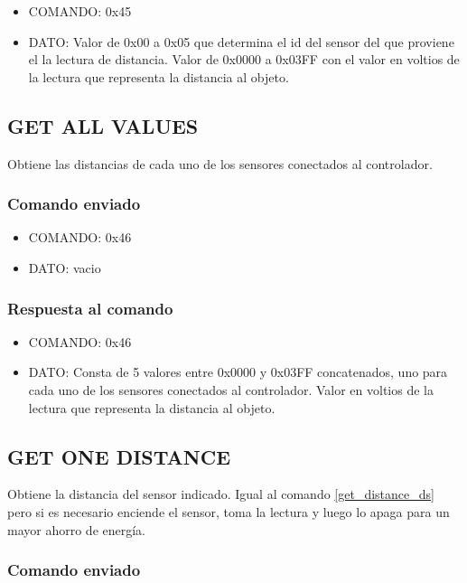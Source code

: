 \documentclass[a4paper,10pt]{article}
\begin{document}
\begin{itemize}
	\item{COMANDO:} 0x45
	\item{DATO:} Valor de 0x00 a 0x05 que determina el id del sensor del que proviene el la lectura de distancia.
	Valor de 0x0000 a 0x03FF con el valor en voltios de la lectura que representa la distancia al objeto.
\end{itemize}

\subsection{GET ALL VALUES}
\label{get_all_values_ds}

Obtiene las distancias de cada uno de los sensores conectados al controlador.

\subsubsection*{Comando enviado}

\begin{itemize}
	\item{COMANDO:} 0x46
	\item{DATO:} vacio
\end{itemize}

\subsubsection*{Respuesta al comando}

\begin{itemize}
	\item{COMANDO:} 0x46
	\item{DATO:} Consta de 5 valores entre 0x0000 y 0x03FF concatenados, uno para cada uno de los sensores conectados al controlador.
	Valor en voltios de la lectura que representa la distancia al objeto.
\end{itemize}

\subsection{GET ONE DISTANCE}
\label{get_one_distance_ds}

Obtiene la distancia del sensor indicado.
Igual al comando \ref{get_distance_ds} pero si es necesario enciende el sensor, toma la lectura y luego lo apaga para un mayor ahorro de energ\'ia.

\subsubsection*{Comando enviado}
\end{document}
